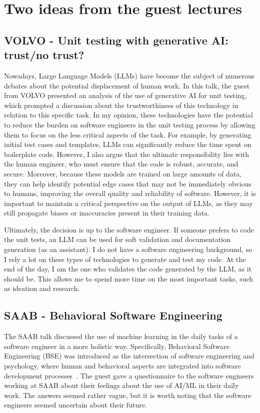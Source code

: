 \documentclass{article}
\begin{document}
\section{Two ideas from the guest lectures}

\subsection{VOLVO - Unit testing with generative AI: trust/no trust?}

Nowadays, Large Language Models (LLMs) have become the subject of numerous debates about the potential displacement of human work.  In this talk, the guest from VOLVO presented an analysis of the use of generative AI for unit testing, which prompted a discussion about the trustworthiness of this technology in relation to this specific task. In my opinion, these technologies have the potential to reduce the burden on software engineers in the unit testing process by allowing them to focus on the less critical aspects of the task. For example, by generating initial test cases and templates, LLMs can significantly reduce the time spent on boilerplate code. However, I also argue that the ultimate responsibility lies with the human engineer, who must ensure that the code is robust, accurate, and secure. Moreover, because these models are trained on large amounts of data, they can help identify potential edge cases that may not be immediately obvious to humans, improving the overall quality and reliability of software. However, it is important to maintain a critical perspective on the output of LLMs, as they may still propagate biases or inaccuracies present in their training data.

Ultimately, the decision is up to the software engineer. If someone prefers to code the unit tests, an LLM can be used for soft validation and documentation generation (as an assistant). I do not have a software engineering background, so I rely a lot on these types of technologies to generate and test my code. At the end of the day, I am the one who validates the code generated by the LLM, as it should be. This allows me to spend more time on the most important tasks, such as ideation and research.

\subsection{SAAB - Behavioral Software Engineering}

The SAAB talk discussed the use of machine learning in the daily tasks of a software engineer in a more holistic way. Specifically, Behavioral Software Engineering (BSE) was introduced as the intersection of software engineering and psychology, where human and behavioral aspects are integrated into software development processes~\cite{lenberg14}. The guest gave a questionnaire to the software engineers working at SAAB about their feelings about the use of AI/ML in their daily work. The answers seemed rather vague, but it is worth noting that the software engineers seemed uncertain about their future. 
\end{document}
